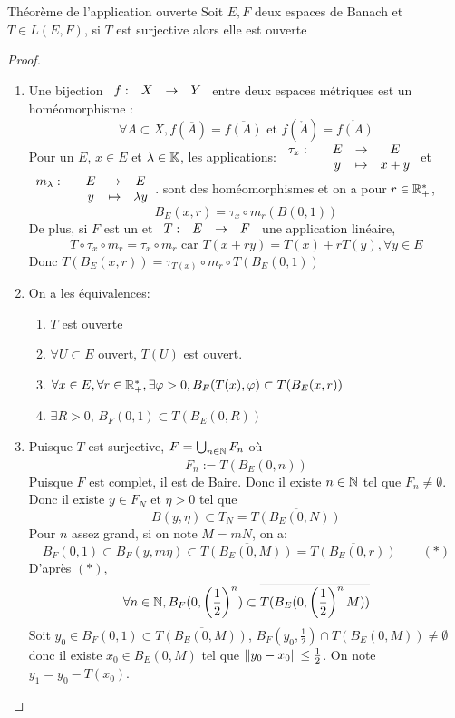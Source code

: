 \documentclass[]{report}
\begin{document}
    \begin{tm}{Théorème de l'application ouverte}{}
        Soit $E,F$ deux espaces de Banach et $T\in L(E,F)$, si $T$ est surjective alors elle est ouverte
    \end{tm}

    \begin{proof}
        \begin{enumerate}
            \item Une bijection $\begin{array}{ccccc} f : & X & \to & Y \end{array}$ entre deux espaces métriques est un homéomorphisme \ssi:
            \[\forall A\subset X,f(\overline{A})=\overline{f(A)}\text{ et }f(\mathring{A})=\mathring{f(A)}\]
            Pour un \evn $E$, $x\in E$ et $\lambda\in \mathbb{K}$, les applications:
            $\begin{array}{ccccc} \tau_x : & & E & \to & E \\ & & y & \mapsto & x+y \end{array}$ et $\begin{array}{ccccc} m_\lambda : & & E & \to & E \\ & & y & \mapsto & \lambda y \end{array}$. sont des homéomorphismes et on a pour $r\in \mathbb{R}_+^*$,
            \[B_E(x,r)=\tau_x\circ m_r(B(0,1))\]
            De plus, si $F$ est un \evn et $\begin{array}{ccccc} T : & E & \to & F \end{array}$ une application linéaire,
            \[ T\circ \tau_x\circ m_r=\tau_x\circ m_r\text{ car }T(x+ry)=T(x)+rT(y),\forall y\in E\]
            Donc $T(B_E(x,r))=\tau_{T(x)}\circ m_r\circ T(B_E(0,1))$
            \item On a les équivalences:
            \begin{enumerate}
                \item $T$ est ouverte
                \item $\forall U\subset E$ ouvert, $T(U)$ est ouvert.
                \item $\forall x\in E,\forall r\in \mathbb{R}_+^*,\exists \varphi>0, B_F(T(x),\varphi)\subset T(B_E(x,r))$
                \item $\exists R>0$, $B_F(0,1)\subset T(B_E(0,R))$
            \end{enumerate}
            \item Puisque $T$ est surjective, $F=\bigcup_{n\in\mathbb{N}} F_n$ où
            \[F_n:= \overline{T(B_E(0,n))}\]
            Puisque $F$ est complet, il est de Baire. Donc il existe $n\in \mathbb{N}$ tel que $F_n\neq \emptyset$. Donc il existe $y\in F_N$ et $\eta>0$ tel que
            \[B(y,\eta)\subset T_N=\overline{T(B_E(0,N))}\]
            Pour $n$ assez grand, si on note $M=mN$, on a:
            \[B_F(0,1)\subset B_F(y,m\eta)\subset \overline{T(B_E(0,M))}=\overline{T(B_E(0,r))}\qquad (*)\]
            D'après $(*)$,
            \[\forall n\in\mathbb{N}, B_F(0,\left(\frac{1}{2}\right)^n)\subset \overline{T(B_E(0,\left(\frac{1}{2}\right)^nM))}\]
            Soit $y_0\in B_F(0,1)\subset \overline{T(B_E(0,M))}$, $B_F(y_0,\frac{1}{2})\cap T(B_E(0,M))\neq \emptyset$ donc il existe $x_0\in B_E(0,M)$ tel que $\lVert y_0-x_0 \rVert\le \frac{1}{2}$. On note $y_1=y_0-T(x_0)$.\\

\end{enumerate}
\end{proof}
\end{document}

